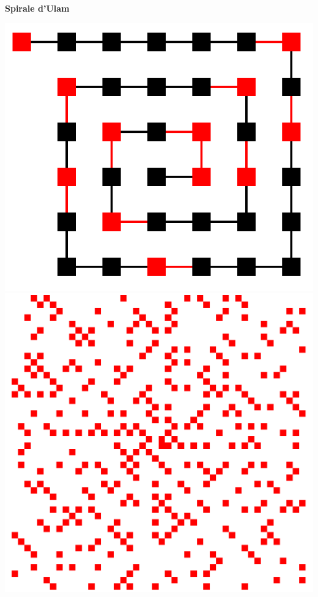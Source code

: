 \begin{frame}

\hfill\hfill\textbf{Spirale d'Ulam}

\bigskip

\begin{center}
\includegraphics[scale=0.23]{figures/ulam1}
\qquad \pause
\includegraphics[scale=0.14]{figures/ulam2}
\end{center}

\end{frame}




